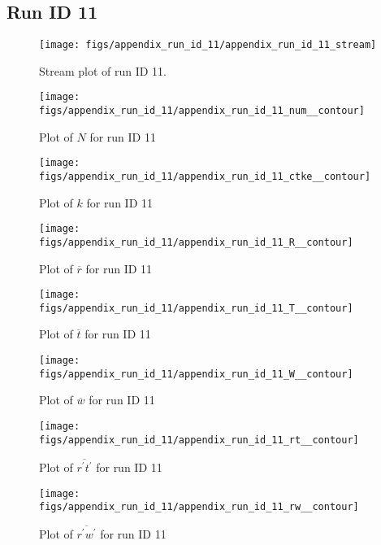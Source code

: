 \subsection{Run ID 11}
\begin{figure}[H]
\centering
\texttt{[image: figs/appendix\_run\_id\_11/appendix\_run\_id\_11\_stream]}
\caption{Stream plot of run ID 11.}
\label{fig:appendix_run_id_11_stream}
\end{figure}


\begin{figure}[H]
\centering
\texttt{[image: figs/appendix\_run\_id\_11/appendix\_run\_id\_11\_num\_\_contour]}
\caption{Plot of $N$ for run ID 11}
\label{fig:appendix_run_id_11_num__contour}
\end{figure}


\begin{figure}[H]
\centering
\texttt{[image: figs/appendix\_run\_id\_11/appendix\_run\_id\_11\_ctke\_\_contour]}
\caption{Plot of $k$ for run ID 11}
\label{fig:appendix_run_id_11_ctke__contour}
\end{figure}


\begin{figure}[H]
\centering
\texttt{[image: figs/appendix\_run\_id\_11/appendix\_run\_id\_11\_R\_\_contour]}
\caption{Plot of $\overline{r}$ for run ID 11}
\label{fig:appendix_run_id_11_R__contour}
\end{figure}


\begin{figure}[H]
\centering
\texttt{[image: figs/appendix\_run\_id\_11/appendix\_run\_id\_11\_T\_\_contour]}
\caption{Plot of $\overline{t}$ for run ID 11}
\label{fig:appendix_run_id_11_T__contour}
\end{figure}


\begin{figure}[H]
\centering
\texttt{[image: figs/appendix\_run\_id\_11/appendix\_run\_id\_11\_W\_\_contour]}
\caption{Plot of $\overline{w}$ for run ID 11}
\label{fig:appendix_run_id_11_W__contour}
\end{figure}


\begin{figure}[H]
\centering
\texttt{[image: figs/appendix\_run\_id\_11/appendix\_run\_id\_11\_rt\_\_contour]}
\caption{Plot of $\overline{r^\prime t^\prime}$ for run ID 11}
\label{fig:appendix_run_id_11_rt__contour}
\end{figure}


\begin{figure}[H]
\centering
\texttt{[image: figs/appendix\_run\_id\_11/appendix\_run\_id\_11\_rw\_\_contour]}
\caption{Plot of $\overline{r^\prime w^\prime}$ for run ID 11}
\label{fig:appendix_run_id_11_rw__contour}
\end{figure}


